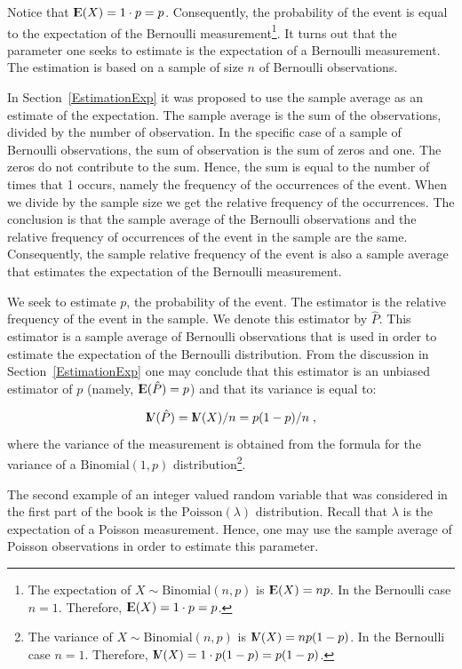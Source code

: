 \documentclass[]{krantz}
\newcommand{\Expec}{{\rm I\kern-.3em E}}
\newcommand{\Var}{{\rm I\kern-.3em V}}
\theoremstyle{definition}
\theoremstyle{definition}
\theoremstyle{definition}
\theoremstyle{remark}
\begin{document}
Notice that \(\Expec(X) = 1 \cdot p = p\). Consequently, the probability
of the event is equal to the expectation of the Bernoulli
measurement\footnote{The expectation of \(X\sim\mathrm{Binomial}(n,p)\)
  is \(\Expec(X)=np\). In the Bernoulli case \(n=1\). Therefore,
  \(\Expec(X) = 1\cdot p = p\).}. It turns out that the parameter one
seeks to estimate is the expectation of a Bernoulli measurement. The
estimation is based on a sample of size \(n\) of Bernoulli observations.

In Section~\ref{EstimationExp} it was proposed to use the sample average
as an estimate of the expectation. The sample average is the sum of the
observations, divided by the number of observation. In the specific case
of a sample of Bernoulli observations, the sum of observation is the sum
of zeros and one. The zeros do not contribute to the sum. Hence, the sum
is equal to the number of times that 1 occurs, namely the frequency of
the occurrences of the event. When we divide by the sample size we get
the relative frequency of the occurrences. The conclusion is that the
sample average of the Bernoulli observations and the relative frequency
of occurrences of the event in the sample are the same. Consequently,
the sample relative frequency of the event is also a sample average that
estimates the expectation of the Bernoulli measurement.

We seek to estimate \(p\), the probability of the event. The estimator
is the relative frequency of the event in the sample. We denote this
estimator by \(\hat P\). This estimator is a sample average of Bernoulli
observations that is used in order to estimate the expectation of the
Bernoulli distribution. From the discussion in
Section~\ref{EstimationExp} one may conclude that this estimator is an
unbiased estimator of \(p\) (namely, \(\Expec(\hat P) = p\)) and that
its variance is equal to:

\[\Var(\hat P) = \Var(X) / n = p(1-p)/n\;,\] where the variance of the
measurement is obtained from the formula for the variance of a
\(\mathrm{Binomial}(1,p)\) distribution\footnote{The variance of
  \(X\sim\mathrm{Binomial}(n,p)\) is \(\Var(X)=np(1-p)\). In the
  Bernoulli case \(n=1\). Therefore,
  \(\Var(X) = 1\cdot p(1-p) = p(1-p)\).}.

The second example of an integer valued random variable that was
considered in the first part of the book is the
\(\mathrm{Poisson}(\lambda)\) distribution. Recall that \(\lambda\) is
the expectation of a Poisson measurement. Hence, one may use the sample
average of Poisson observations in order to estimate this parameter.
\end{document}
